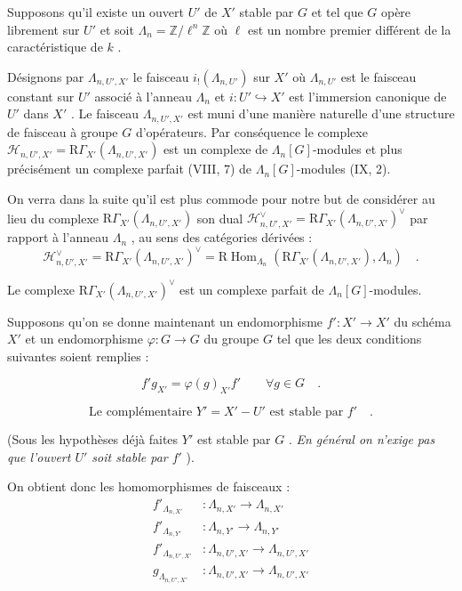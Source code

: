 \documentclass[11pt]{article}
\DeclareMathOperator{\Hom}{Hom}
\newcommand{\R}{\mathrm{R}}\newcommand{\RHomCore}{\mathrm{RHom}}
\providecommand{\Hom}{\operatorname{Hom}}
\providecommand{\R}{\mathrm R}
\providecommand{\La}{\Lambda}
\providecommand{\bZ}{\mathbb Z}
\providecommand{\Hom}{\operatorname{Hom}}
\begin{document}
Supposons qu'il existe un ouvert $U'$ de $X'$ stable par $G$ et tel que $G$ opère librement sur $U'$ et soit $\La_n = \bZ/\ell^n\bZ$ où $\ell$ est un nombre premier différent de la caractéristique de $k$ .

Désignons par $\La_{n,U',X'}$ le faisceau $i_!(\La_{n,U'})$ sur $X'$ où $\La_{n,U'}$ est le faisceau constant sur $U'$ associé à l'anneau $\La_n$ et $i : U' \hookrightarrow X'$ est l'immersion canonique de $U'$ dans $X'$ . Le faisceau $\La_{n,U',X'}$ est muni d'une manière naturelle d'une structure de faisceau à groupe $G$ d'opérateurs. Par conséquence le complexe $\mathcal{H}_{n,U',X'} = \R\Gamma_{X'}(\La_{n,U',X'})$ est un complexe de $\La_n[G]$-modules
et plus précisément un complexe parfait (VIII, 7) de $\La_n[G]$-modules (IX, 2).

On verra dans la suite qu'il est plus commode pour notre but de considérer au lieu du complexe $\R\Gamma_{X'}(\La_{n,U',X'})$ son dual $\mathcal{H}_{n,U',X'}^\vee = \R\Gamma_{X'}(\La_{n,U',X'})^\vee$ par rapport à l'anneau $\La_n$ , au sens des catégories dérivées :
\[
\mathcal{H}_{n,U',X'}^\vee = \R\Gamma_{X'}(\La_{n,U',X'})^\vee = \R\Hom_{\La_n}(\R\Gamma_{X'}(\La_{n,U',X'}), \La_n) \quad .
\]

Le complexe $\R\Gamma_{X'}(\La_{n,U',X'})^\vee$ est un complexe parfait de $\La_n[G]$-modules.

Supposons qu'on se donne maintenant un endomorphisme $f' : X' \to X'$ du schéma $X'$ et un endomorphisme $\varphi : G \to G$ du groupe $G$ tel que les deux conditions suivantes soient remplies :

\begin{equation}\tag{1.1}
f' g_{X'} = \varphi(g)_{X'} f' \qquad \forall g \in G \quad .
\end{equation}

\begin{equation}\tag{1.2}
\text{Le complémentaire } Y' = X' - U' \text{ est stable par } f' \quad .
\end{equation}

(Sous les hypothèses déjà faites $Y'$ est stable par $G$ . \emph{En général on n'exige pas que l'ouvert $U'$ soit stable par $f'$} ).

On obtient donc les homomorphismes de faisceaux :
\begin{align*}
f'_{\La_{n,X'}} &: \La_{n,X'} \longrightarrow \La_{n,X'} \\
f'_{\La_{n,Y'}} &: \La_{n,Y'} \longrightarrow \La_{n,Y'} \\
f'_{\La_{n,U',X'}} &: \La_{n,U',X'} \longrightarrow \La_{n,U',X'} \\
g_{\La_{n,U',X'}} &: \La_{n,U',X'} \longrightarrow \La_{n,U',X'}
\end{align*}
\end{document}
